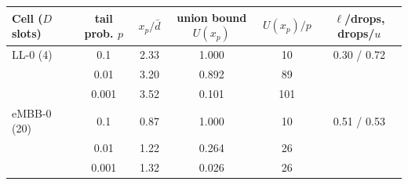 \begin{tabular}{lccccc}
\hline
Cell ($D$ slots) & tail prob. $p$ & $x_p/\bar d$ & union bound $U(x_p)$ & $U(x_p)/p$ & $\ell$/drops, drops/$u$ \\
\hline
LL-0 (4) & 0.1 & 2.33 & 1.000 & 10 & 0.30 / 0.72 \\
 & 0.01 & 3.20 & 0.892 & 89 &  \\
 & 0.001 & 3.52 & 0.101 & 101 &  \\
eMBB-0 (20) & 0.1 & 0.87 & 1.000 & 10 & 0.51 / 0.53 \\
 & 0.01 & 1.22 & 0.264 & 26 &  \\
 & 0.001 & 1.32 & 0.026 & 26 &  \\
\hline
\end{tabular}
